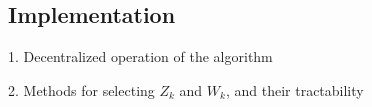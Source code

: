 \subsection{Implementation}
1. Decentralized operation of the algorithm

2. Methods for selecting $Z_k$ and $W_k$, and their tractability